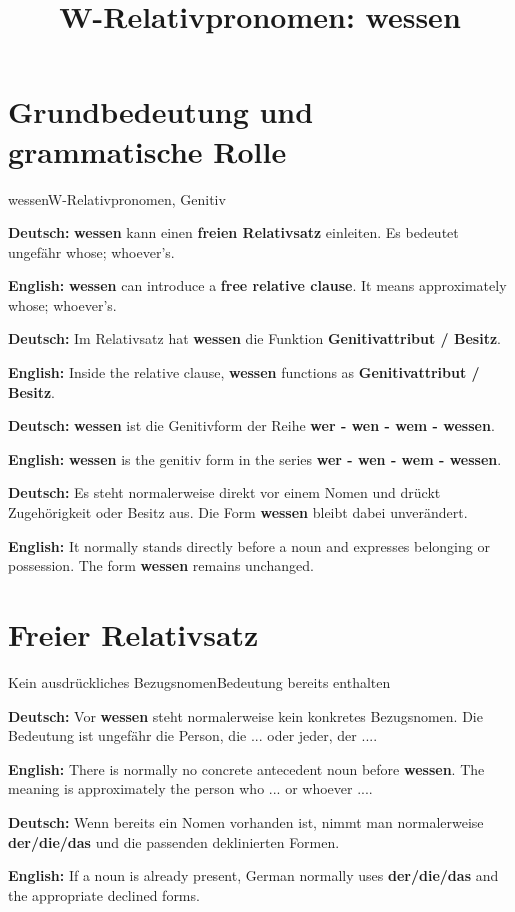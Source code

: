 \documentclass[a4paper,11pt]{article}
\title{W-Relativpronomen: \glqq wessen\grqq{}}
\date{}
\newcommand{\GermanText}[1]{\textbf{Deutsch: }#1\par}
\newcommand{\EnglishText}[1]{{\small\color{SoftGray}\textbf{English: }#1\par}}
\begin{document}
\maketitle

\tableofcontents

\newpage

\section{Grundbedeutung und grammatische Rolle}

\begin{grammarentry}{wessen}{W-Relativpronomen, Genitiv}

\GermanText{\textbf{wessen} kann einen \textbf{freien Relativsatz} einleiten. Es bedeutet ungefähr \glqq whose; whoever's\grqq{}.}

\EnglishText{\textbf{wessen} can introduce a \textbf{free relative clause}. It means approximately \glqq whose; whoever's\grqq{}.}

\GermanText{Im Relativsatz hat \textbf{wessen} die Funktion \textbf{Genitivattribut / Besitz}.}

\EnglishText{Inside the relative clause, \textbf{wessen} functions as \textbf{Genitivattribut / Besitz}.}

\GermanText{\textbf{wessen} ist die Genitivform der Reihe \textbf{wer - wen - wem - wessen}.}

\EnglishText{\textbf{wessen} is the genitiv form in the series \textbf{wer - wen - wem - wessen}.}

\GermanText{Es steht normalerweise direkt vor einem Nomen und drückt Zugehörigkeit oder Besitz aus. Die Form \textbf{wessen} bleibt dabei unverändert.}

\EnglishText{It normally stands directly before a noun and expresses belonging or possession. The form \textbf{wessen} remains unchanged.}

\end{grammarentry}

\section{Freier Relativsatz}

\begin{grammarentry}{Kein ausdrückliches Bezugsnomen}{Bedeutung bereits enthalten}

\GermanText{Vor \textbf{wessen} steht normalerweise kein konkretes Bezugsnomen. Die Bedeutung ist ungefähr \glqq die Person, die ...\grqq{} oder \glqq jeder, der ...\grqq{}.}

\EnglishText{There is normally no concrete antecedent noun before \textbf{wessen}. The meaning is approximately \glqq the person who ...\grqq{} or \glqq whoever ...\grqq{}.}

\GermanText{Wenn bereits ein Nomen vorhanden ist, nimmt man normalerweise \textbf{der/die/das} und die passenden deklinierten Formen.}

\EnglishText{If a noun is already present, German normally uses \textbf{der/die/das} and the appropriate declined forms.}

\end{grammarentry}
\end{document}
